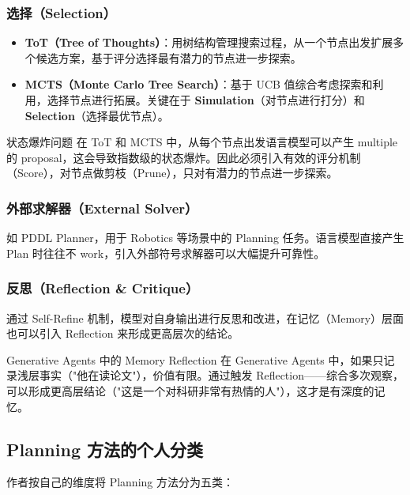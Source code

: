 \documentclass[a4paper]{article}
\begin{document}
\subsubsection{选择（Selection）}

\begin{itemize}
    \item \textbf{ToT（Tree of Thoughts）}：用树结构管理搜索过程，从一个节点出发扩展多个候选方案，基于评分选择最有潜力的节点进一步探索。
    \item \textbf{MCTS（Monte Carlo Tree Search）}：基于 UCB 值综合考虑探索和利用，选择节点进行拓展。关键在于 \textbf{Simulation}（对节点进行打分）和 \textbf{Selection}（选择最优节点）。
\end{itemize}

\begin{warningbox}{状态爆炸问题}
在 ToT 和 MCTS 中，从每个节点出发语言模型可以产生 multiple 的 proposal，这会导致指数级的状态爆炸。因此必须引入有效的评分机制（Score），对节点做剪枝（Prune），只对有潜力的节点进一步探索。
\end{warningbox}

\subsubsection{外部求解器（External Solver）}

如 PDDL Planner，用于 Robotics 等场景中的 Planning 任务。语言模型直接产生 Plan 时往往不 work，引入外部符号求解器可以大幅提升可靠性。

\subsubsection{反思（Reflection \& Critique）}

通过 Self-Refine 机制，模型对自身输出进行反思和改进，在记忆（Memory）层面也可以引入 Reflection 来形成更高层次的结论。

\begin{knowledgebox}{Generative Agents 中的 Memory Reflection}
在 Generative Agents 中，如果只记录浅层事实（"他在读论文"），价值有限。通过触发 Reflection——综合多次观察，可以形成更高层结论（"这是一个对科研非常有热情的人"），这才是有深度的记忆。
\end{knowledgebox}

\subsection{Planning 方法的个人分类}

作者按自己的维度将 Planning 方法分为五类：
\end{document}
